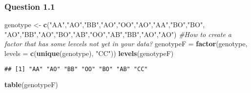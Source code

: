 \documentclass[]{article}
\newenvironment{Shaded}{\begin{snugshade}}{\end{snugshade}}
\newcommand{\KeywordTok}[1]{\textcolor[rgb]{0.13,0.29,0.53}{\textbf{#1}}}
\newcommand{\DataTypeTok}[1]{\textcolor[rgb]{0.13,0.29,0.53}{#1}}
\newcommand{\DecValTok}[1]{\textcolor[rgb]{0.00,0.00,0.81}{#1}}
\newcommand{\StringTok}[1]{\textcolor[rgb]{0.31,0.60,0.02}{#1}}
\newcommand{\CommentTok}[1]{\textcolor[rgb]{0.56,0.35,0.01}{\textit{#1}}}
\newcommand{\OperatorTok}[1]{\textcolor[rgb]{0.81,0.36,0.00}{\textbf{#1}}}
\newcommand{\NormalTok}[1]{#1}
\begin{document}
\begin{Shaded}
\end{Shaded}

\subsubsection{Question 1.1}\label{question-1.1}

\begin{Shaded}
\begin{Highlighting}[]
\NormalTok{genotype <-}\StringTok{ }\KeywordTok{c}\NormalTok{(}\StringTok{"AA"}\NormalTok{,}\StringTok{"AO"}\NormalTok{,}\StringTok{"BB"}\NormalTok{,}\StringTok{"AO"}\NormalTok{,}\StringTok{"OO"}\NormalTok{,}\StringTok{"AO"}\NormalTok{,}\StringTok{"AA"}\NormalTok{,}\StringTok{"BO"}\NormalTok{,}\StringTok{"BO"}\NormalTok{,}
             \StringTok{"AO"}\NormalTok{,}\StringTok{"BB"}\NormalTok{,}\StringTok{"AO"}\NormalTok{,}\StringTok{"BO"}\NormalTok{,}\StringTok{"AB"}\NormalTok{,}\StringTok{"OO"}\NormalTok{,}\StringTok{"AB"}\NormalTok{,}\StringTok{"BB"}\NormalTok{,}\StringTok{"AO"}\NormalTok{,}\StringTok{"AO"}\NormalTok{)}
\CommentTok{#How to create a factor that has some levcels not yet in your data?}
\NormalTok{genotypeF =}\StringTok{ }\KeywordTok{factor}\NormalTok{(genotype, }\DataTypeTok{levels =} \KeywordTok{c}\NormalTok{(}\KeywordTok{unique}\NormalTok{(genotype), }\StringTok{"CC"}\NormalTok{))}
\KeywordTok{levels}\NormalTok{(genotypeF)}
\end{Highlighting}
\end{Shaded}

\begin{verbatim}
## [1] "AA" "AO" "BB" "OO" "BO" "AB" "CC"
\end{verbatim}

\begin{Shaded}
\begin{Highlighting}[]
\KeywordTok{table}\NormalTok{(genotypeF)}
\end{Highlighting}
\end{Shaded}
\end{document}
